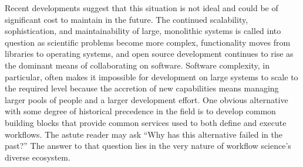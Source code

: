 Recent developments suggest that this situation is not ideal and could be
of significant cost to maintain in the future. The continued scalability,
sophistication, and maintainability of large, monolithic systems is called into
question as scientific problems become more complex, functionality moves from
libraries to operating systems, and open source development continues to rise
as the dominant means of collaborating on software. Software complexity, in
particular, often makes it impossible for development on large systems to scale
to the required level because the accretion of new capabilities means managing
larger pools of people and a larger development effort. One obvious
alternative with some degree of historical precedence in the field is to
develop common building blocks that provide common services used to both define
and execute workflows. The astute reader may ask ``Why has this alternative
failed in the past?'' The answer to that question lies in the very nature of
workflow science's diverse ecosystem. 

